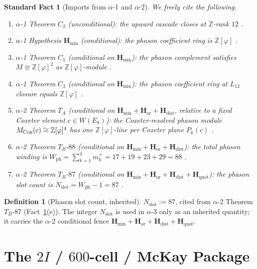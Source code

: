 \documentclass[11pt, a4paper]{amsart}
\newtheorem{fact}[theorem]{Standard Fact}
\theoremstyle{definition}
\newtheorem{definition}[theorem]{Definition}
\newcommand{\Z}{\mathbb{Z}}
\newcommand{\Hmin}{\mathbf{H}_{\min}}
\newcommand{\Hor}{\mathbf{H}_{\mathrm{or}}}
\newcommand{\Hdist}{\mathbf{H}_{\mathrm{dist}}}
\newcommand{\Hquot}{\mathbf{H}_{\mathrm{quot}}}
\newcommand{\Ophi}{\mathbb{Z}[\varphi]}
\newcommand{\Wph}{W_{\mathrm{ph}}}
\newcommand{\Nslot}{N_{\mathrm{slot}}}
\begin{document}
\begin{fact}[Imports from $\alpha$-1 and $\alpha$-2]
\label{fact:imports}
We freely cite the following.
\begin{enumerate}
\item[(a)] $\alpha$-1 Theorem $C_2$ (\emph{unconditional}):
  the upward cascade closes at $\Z$-rank $12$
  \cite[Thm.~thm:C2]{Cascade12D}.
\item[(b)] $\alpha$-1 Hypothesis $\Hmin$
  (\emph{conditional}): the phason coefficient ring is
  $\Ophi$ \cite[Hyp.~hyp:Hmin]{Cascade12D}.
\item[(b1)] $\alpha$-1 Theorem $C_1$ (\emph{conditional on
  $\Hmin$}): the phason complement satisfies $M \cong
  \Ophi^{2}$ as $\Ophi$-module
  \cite[Thm.~thm:C1]{Cascade12D}.
\item[(b2)] $\alpha$-1 Theorem $C_3$ (\emph{conditional on
  $\Hmin$}): the phason coefficient ring at $L_{12}$
  closure equals $\Ophi$
  \cite[Thm.~thm:C3]{Cascade12D}.
\item[(c)] $\alpha$-2 Theorem $T_A$ (\emph{conditional on
  $\Hmin + \Hor + \Hdist$, relative to a fixed Coxeter
  element $c \in W(E_8)$}): the Coxeter-resolved phason
  module $M_{\rm Cox}(c) \cong \Ophi^{4}$ has one
  $\Ophi$-line per Coxeter plane $P_k(c)$
  \cite[Thm.~thm:TA]{CascadePhasonCoxeter}.
\item[(d)] $\alpha$-2 Theorem $T_B$-$88$ (\emph{conditional
  on $\Hmin + \Hor + \Hdist$}): the total phason winding is
  $\Wph = \sum_{k=1}^{4} m_k^+ = 17 + 19 + 23 + 29 = 88$
  \cite[Thm.~thm:TB-88]{CascadePhasonCoxeter}.
\item[(e)] $\alpha$-2 Theorem $T_B$-$87$ (\emph{conditional
  on $\Hmin + \Hor + \Hdist + \Hquot$}): the phason slot
  count is $\Nslot = \Wph - 1 = 87$
  \cite[Thm.~thm:TB-87]{CascadePhasonCoxeter}.
\end{enumerate}
\end{fact}

\begin{definition}[Phason slot count, inherited]
\label{def:Nslot}
$\Nslot := 87$, cited from $\alpha$-2 Theorem $T_B$-$87$
(Fact~\ref{fact:imports}(e)). The integer $\Nslot$ is used
in $\alpha$-3 only as an inherited quantity; it carries the
$\alpha$-2 conditional fence
$\Hmin + \Hor + \Hdist + \Hquot$.
\end{definition}

\section{The $2I$ / $600$-cell / McKay Package}
\label{sec:McKay-pack}
\end{document}
